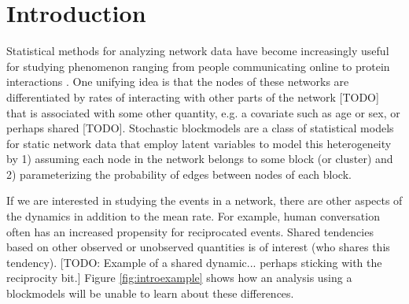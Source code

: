 \section{Introduction}

Statistical methods for analyzing network data have become increasingly useful for studying  phenomenon ranging from people communicating online to protein interactions \cite{Goldenberg2009}.
One unifying idea is that the nodes of these networks are differentiated by rates of interacting with other parts of the network [TODO] that is associated with some other quantity, e.g. a covariate such as age or sex, or perhaps shared [TODO].
Stochastic blockmodels \cite{Nowicki2001, Kemp, Ishiguro2010, Rodriguez} are a class of statistical models for static network data that employ latent variables to model this heterogeneity by 1) assuming each node in the network belongs to some block (or cluster) and 2) parameterizing the probability of edges between nodes of each block. 

If we are interested in studying the events in a network, there are other aspects of the dynamics in addition to the mean rate. 
For example, human conversation often has an increased propensity for reciprocated events.
Shared tendencies based on other observed or unobserved quantities is of interest (who shares this tendency).
[TODO: Example of a shared dynamic... perhaps sticking with the reciprocity bit.]
Figure \ref{fig:introexample} shows how an analysis using a blockmodels will be unable to learn about these differences.




